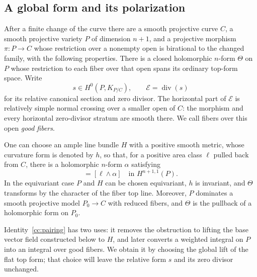 \subsection{A global form and its polarization}

\begin{lemma}
\label{cc:preparation}
After a finite change of the curve there are a smooth projective curve
$C$, a smooth projective variety $P$ of dimension $n+1$, and a projective
morphism $\pi:P\to C$ whose restriction over a nonempty open is
birational to the changed family, with the following properties.
There is a closed holomorphic $n$-form $\Theta$ on $P$ whose restriction
to each fiber over that open spans its ordinary top-form space.  Write
\[
 s\in H^0(P,K_{P/C}),\qquad \mathcal E=\operatorname{div}(s)
\]
for its relative canonical section and zero divisor.  The horizontal
part of $\mathcal E$ is relatively simple normal crossing over a smaller
open of $C$: the morphism and every horizontal zero-divisor stratum
are smooth there.  We call fibers over this open \emph{good fibers}.

One can choose an ample line bundle $H$ with a positive smooth metric,
whose curvature form is denoted by $h$, so that, for a positive area
class $\ell$ pulled back from $C$, there is a holomorphic $n$-form
$\alpha$ satisfying
\begin{equation}
           [h\wedge\Theta]=[\ell\wedge\alpha]
                  \quad\text{in }H^{n+1,1}(P).
\label{cc:pairing}
\end{equation}
In the equivariant case $P$ and $H$ can be chosen equivariant, $h$ is
invariant, and $\Theta$ transforms by the character of the fiber top
line.  Moreover, $P$ dominates a smooth projective model $P_0\to C$
with reduced fibers, and $\Theta$ is the pullback of a holomorphic form
on $P_0$.
\end{lemma}

Identity~\eqref{cc:pairing} has two uses: it removes the obstruction
to lifting the base vector field constructed below to $H$, and
later converts a weighted
integral on $P$ into an integral over good fibers. We obtain it by
choosing the global lift of the flat top form; that choice will leave
the relative form $s$ and its zero divisor unchanged.

